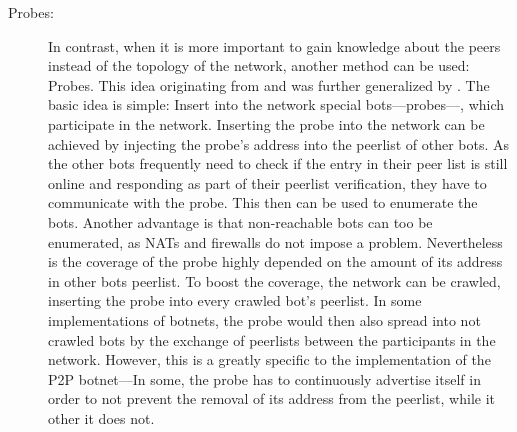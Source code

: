 \documentclass[10pt, a4paper, twocolumn]{article} %
\begin{document}
\begin{description}
\item[Probes:] In contrast, when it is more important to gain knowledge about the peers instead of the topology of the network, another method can be used: Probes. This idea originating from \citet{kang} and was further generalized by \citet{p2pwned}. The basic idea is simple: Insert into the network special bots---probes---, which participate in the network. Inserting the probe into the network can be achieved by injecting the probe's address into the peerlist of other bots. As the other bots frequently need to check if the entry in their peer list is still online and responding as part of their peerlist verification, they have to communicate with the probe. This then can be used to enumerate the bots. Another advantage is that non-reachable bots can too be enumerated, as NATs and firewalls do not impose a problem. 
Nevertheless is the coverage of the probe highly depended on the amount of its address in other bots peerlist. To boost the coverage, the network can be crawled, inserting the probe into every crawled bot's peerlist. In some implementations of botnets, the probe would then also spread into not crawled bots by the exchange of peerlists between the participants in the network. 
However, this is a greatly specific to the implementation of the P2P botnet---In some, the probe has to continuously advertise itself in order to not prevent the removal of its address from the peerlist, while it other it does not. 
\end{description}
\end{document}
